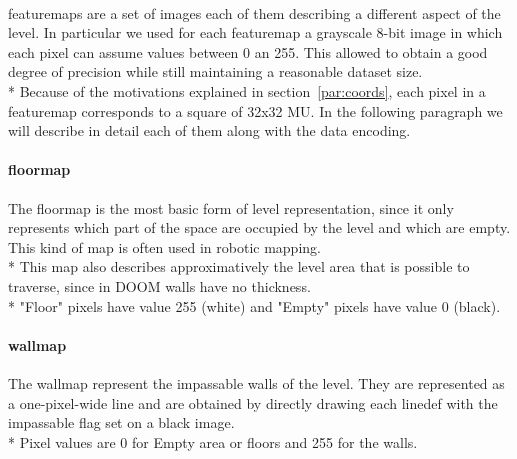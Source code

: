 \paragraph{} \glspl{featuremap} are a set of images each of them describing a different aspect of the level. In particular we used for each \gls{featuremap} a grayscale 8-bit image in which each pixel can assume values between 0 an 255. This allowed to obtain a good degree of precision while still maintaining a reasonable dataset size. \\*
Because of the motivations explained in section~\ref{par:coords}, each pixel in a \gls{featuremap} corresponds to a square of 32x32 \gls{MU}. 
In the following paragraph we will describe in detail each of them along with the data encoding.

\paragraph{\gls{floormap}} The \gls{floormap} is the most basic form of level representation, since it only represents which part of the space are occupied by the level and which are empty. This kind of map is often used in robotic mapping. \\*
This map also describes approximatively the level area that is possible to traverse, since in DOOM walls have no thickness. \\*
"Floor" pixels have value 255 (white) and "Empty" pixels have value 0 (black).

\paragraph{\gls{wallmap}} The \gls{wallmap} represent the impassable walls of the level. They are represented as a one-pixel-wide line and are obtained by directly drawing each \gls{linedef} with the impassable flag set on a black image. \\*
Pixel values are 0 for Empty area or floors and 255 for the walls.

